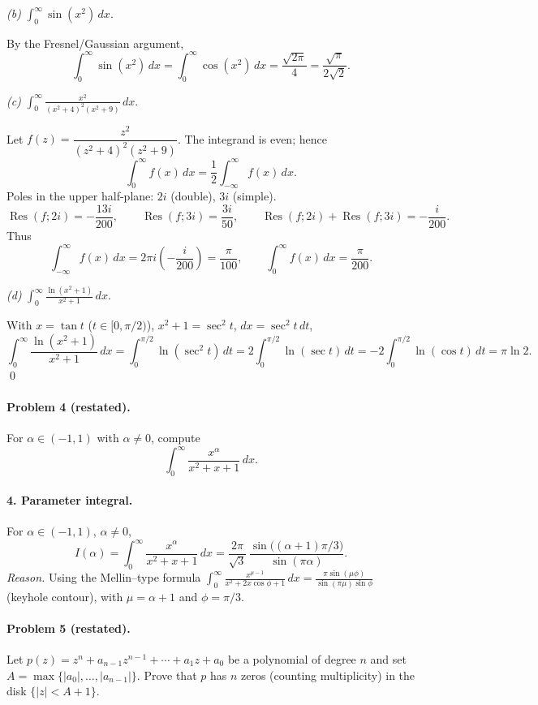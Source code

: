 \documentclass[11pt,a4paper]{article}
\theoremstyle{definition}
\theoremstyle{definition}
\theoremstyle{plain}
\theoremstyle{remark}
\DeclareMathOperator{\Res}{Res}
\begin{document}
\medskip
\emph{(b)} $\displaystyle \int_{0}^{\infty}\sin(x^{2})\,dx$.

By the Fresnel/Gaussian argument,
\[
\int_{0}^{\infty}\sin(x^{2})\,dx
=\int_{0}^{\infty}\cos(x^{2})\,dx
=\boxed{\frac{\sqrt{2\pi}}{4}=\frac{\sqrt{\pi}}{2\sqrt2}}.
\]

\medskip
\emph{(c)} $\displaystyle \int_{0}^{\infty}\frac{x^{2}}{(x^{2}+4)^{2}(x^{2}+9)}\,dx$.

Let $f(z)=\dfrac{z^{2}}{(z^{2}+4)^{2}(z^{2}+9)}$. The integrand is even; hence
\[
\int_{0}^{\infty}f(x)\,dx=\frac12\int_{-\infty}^{\infty}f(x)\,dx.
\]
Poles in the upper half-plane: $2i$ (double), $3i$ (simple).
\[
\Res(f;2i)=-\frac{13i}{200},\qquad \Res(f;3i)=\frac{3i}{50},\qquad
\Res(f;2i)+\Res(f;3i)=-\frac{i}{200}.
\]
Thus
\[
\int_{-\infty}^{\infty} f(x)\,dx
=2\pi i\!\left(-\frac{i}{200}\right)=\frac{\pi}{100},
\qquad
\int_{0}^{\infty} f(x)\,dx=\boxed{\frac{\pi}{200}}.
\]

\medskip
\emph{(d)} $\displaystyle \int_{0}^{\infty}\frac{\ln(x^{2}+1)}{x^{2}+1}\,dx$.

With $x=\tan t$ ($t\in[0,\pi/2)$), $x^{2}+1=\sec^{2}t$, $dx=\sec^{2}t\,dt$,
\[
\int_{0}^{\infty}\frac{\ln(x^{2}+1)}{x^{2}+1}\,dx
=\int_{0}^{\pi/2}\ln(\sec^{2}t)\,dt
=2\int_{0}^{\pi/2}\ln(\sec t)\,dt
=-2\int_{0}^{\pi/2}\ln(\cos t)\,dt
=\boxed{\pi\ln 2}.
\]
\qed

\paragraph{Problem 4 (restated).}
For $\alpha\in(-1,1)$ with $\alpha\neq0$, compute
\[
\int_{0}^{\infty}\frac{x^{\alpha}}{x^{2}+x+1}\,dx .
\]

\paragraph{4. Parameter integral.}
For $\alpha\in(-1,1)$, $\alpha\neq 0$,
\[
I(\alpha)=\int_{0}^{\infty}\frac{x^{\alpha}}{x^{2}+x+1}\,dx
=\frac{2\pi}{\sqrt3}\,\frac{\sin\!\big((\alpha+1)\pi/3\big)}{\sin(\pi\alpha)}.
\]
\emph{Reason.} Using the Mellin–type formula
$\displaystyle \int_{0}^{\infty}\frac{x^{\mu-1}}{x^{2}+2x\cos\phi+1}\,dx
=\frac{\pi\sin(\mu\phi)}{\sin(\pi\mu)\sin\phi}$ (keyhole contour),
with $\mu=\alpha+1$ and $\phi=\pi/3$.

\medskip

\paragraph{Problem 5 (restated).}
Let $p(z)=z^{n}+a_{n-1}z^{n-1}+\cdots+a_1 z+a_0$ be a polynomial of degree $n$ and set
$A=\max\{|a_0|,\dots,|a_{n-1}|\}$. Prove that $p$ has $n$ zeros
(counting multiplicity) in the disk $\{|z|<A+1\}$.
\end{document}
